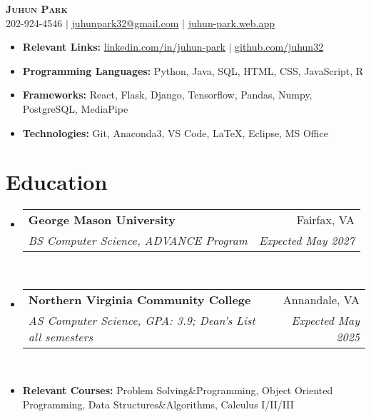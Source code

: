 \documentclass[letterpaper,11pt]{article}
\makeatletter
\newcommand{\resumeItem}[1]{
  \item\small{
    {#1 \vspace{-3pt}}
  }
}
\newcommand{\resumeItemThin}[1]{
  \item\small{
    {#1 \vspace{-7pt}}
  }
}
\newcommand{\resumeSubheading}[4]{
    \item
    \begin{tabular*}{0.97\textwidth}[t]{l@{\extracolsep{\fill}}r@{\hspace{-0.2in}}}
        \small{\textbf{#1}} & \small{#2} \\
        \textit{\small#3} & \textit{\small #4} \\
    \end{tabular*}\vspace{-5pt}
}
\newcommand{\resumeSubHeadingListStart}{\begin{itemize}[leftmargin=0.00in, rightmargin=-0.2in, label={}]}
\newcommand{\resumeSubHeadingListEnd}{\end{itemize}\vspace{-7pt}}
\newcommand{\resumeItemListStart}{\begin{itemize}[leftmargin=0.15in, rightmargin=0.15in]}
\newcommand{\resumeItemListEnd}{\end{itemize}\vspace{-7pt}}
\makeatother
\begin{document}

\begin{center}
    \textbf{\Huge \scshape {Juhun Park}} \\ \vspace{1pt}
    \small 202-924-4546 $|$
    \href{mailto:riann3207@gmail.com}{\underline{juhunpark32@gmail.com}} $|$
    \href{https://juhun-park.web.app/}{\underline{juhun-park.web.app}}
\end{center}

\vspace{-7pt}


\resumeItemListStart
\resumeItemThin{\textbf{Relevant Links: }
    \href{https://linkedin.com/in/juhun-park}{\underline{linkedin.com/in/juhun-park}} $|$
    \href{https://github.com/juhun32}{\underline{github.com/juhun32}}} \\

\resumeItemThin{\textbf{Programming Languages: } {Python, Java, SQL, HTML, CSS, JavaScript, R}}\\
\resumeItemThin{\textbf{Frameworks: }{React, Flask, Django, Tensorflow, Pandas, Numpy, PostgreSQL, MediaPipe}}\\
\resumeItemThin{\textbf{Technologies: } {Git, Anaconda3, VS Code, LaTeX, Eclipse, MS Office}}\\
\resumeItemListEnd


\section{Education}
\resumeSubHeadingListStart
\resumeSubheading
{George Mason University}{Fairfax, VA}
{BS Computer Science, ADVANCE Program}{Expected May 2027}\\

\resumeSubheading
{Northern Virginia Community College}{Annandale, VA}
{AS Computer Science, GPA: 3.9; Dean's List all semesters}{Expected May 2025} \\

\resumeItem{\textbf{Relevant Courses: }{Problem Solving\&Programming, Object Oriented Programming, Data Structures\&Algorithms, Calculus I/II/III}}
\resumeSubHeadingListEnd


\end{document}
